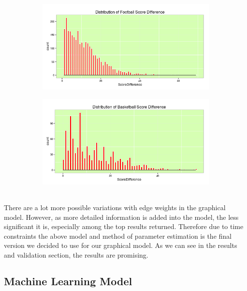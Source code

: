 \documentclass[11pt,notitlepage]{article}
\begin{document}
\begin{figure}[H]
      \centering
      \begin{subfigure}{0.48\textwidth}
      \centering
      \includegraphics[width=1.1\textwidth]{graphs/basketball_diff_dist.png}
      \end{subfigure}\quad
      \begin{subfigure}{0.48\textwidth}
      \centering
      \includegraphics[width=1.1\textwidth]{graphs/football_diff_dist.png}
      \end{subfigure}
 \end{figure}

\noindent 
\\

\noindent There are a lot more possible variations with edge weights in the graphical model. However, as more detailed information is added into the model, the less significant it is, especially among the top results returned. Therefore due to time constraints the above model and method of parameter estimation is the final version we decided to use for our graphical model. As we can see in the results and validation section, the results are promising.

\subsection{Machine Learning Model}
\end{document}
